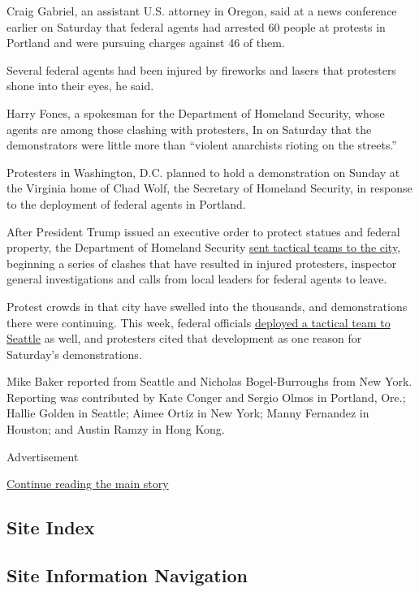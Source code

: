 Craig Gabriel, an assistant U.S. attorney in Oregon, said at a news
conference earlier on Saturday that federal agents had arrested 60
people at protests in Portland and were pursuing charges against 46 of
them.

Several federal agents had been injured by fireworks and lasers that
protesters shone into their eyes, he said.

Harry Fones, a spokesman for the Department of Homeland Security, whose
agents are among those clashing with protesters, In on Saturday that the
demonstrators were little more than ``violent anarchists rioting on the
streets.''

Protesters in Washington, D.C. planned to hold a demonstration on Sunday
at the Virginia home of Chad Wolf, the Secretary of Homeland Security,
in response to the deployment of federal agents in Portland.

After President Trump issued an executive order to protect statues and
federal property, the Department of Homeland Security
\href{https://www.nytimes3xbfgragh.onion/2020/07/25/us/portland-federal-legal-jurisdiction-courts.html}{sent
tactical teams to the city}, beginning a series of clashes that have
resulted in injured protesters, inspector general investigations and
calls from local leaders for federal agents to leave.

Protest crowds in that city have swelled into the thousands, and
demonstrations there were continuing. This week, federal officials
\href{https://www.nytimes3xbfgragh.onion/2020/07/23/us/seattle-protests-feds.html}{deployed
a tactical team to Seattle} as well, and protesters cited that
development as one reason for Saturday's demonstrations.

Mike Baker reported from Seattle and Nicholas Bogel-Burroughs from New
York. Reporting was contributed by Kate Conger and Sergio Olmos in
Portland, Ore.; Hallie Golden in Seattle; Aimee Ortiz in New York; Manny
Fernandez in Houston; and Austin Ramzy in Hong Kong.

Advertisement

\protect\hyperlink{after-bottom}{Continue reading the main story}

\hypertarget{site-index}{%
\subsection{Site Index}\label{site-index}}

\hypertarget{site-information-navigation}{%
\subsection{Site Information
Navigation}\label{site-information-navigation}}


